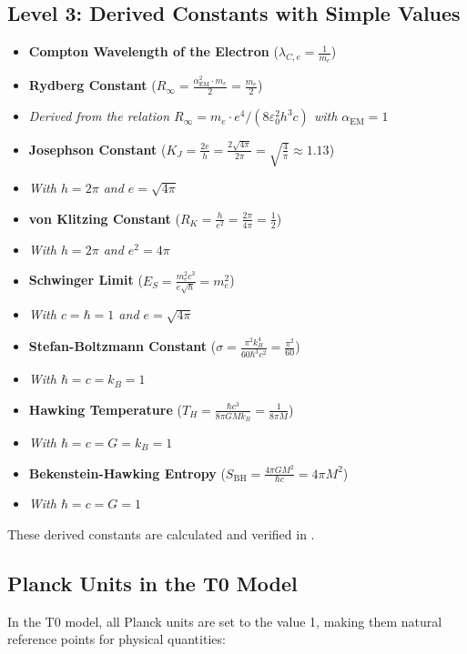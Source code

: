 \documentclass[12pt,a4paper]{article}
\newcommand{\alphaEM}{\alpha_{\text{EM}}}
\begin{document}
	\subsection*{Level 3: Derived Constants with Simple Values}
	\begin{itemize}[itemsep=0.5em]
		\item \textbf{Compton Wavelength of the Electron} (\(\lambda_{C,e} = \frac{1}{m_e}\))
		\item \textbf{Rydberg Constant} (\(R_\infty = \frac{\alphaEM^2 \cdot m_e}{2} = \frac{m_e}{2}\))
		\item[] \textit{Derived from the relation $R_\infty = m_e\cdot e^4/(8\varepsilon_0^2h^3c)$ with $\alphaEM = 1$}
		\item \textbf{Josephson Constant} (\(K_J = \frac{2e}{h} = \frac{2\sqrt{4\pi}}{2\pi} = \sqrt{\frac{4}{\pi}} \approx 1.13\))
		\item[] \textit{With $h = 2\pi$ and $e = \sqrt{4\pi}$}
		\item \textbf{von Klitzing Constant} (\(R_K = \frac{h}{e^2} = \frac{2\pi}{4\pi} = \frac{1}{2}\))
		\item[] \textit{With $h = 2\pi$ and $e^2 = 4\pi$}
		\item \textbf{Schwinger Limit} (\(E_S = \frac{m_e^2c^3}{e\sqrt{\hbar}} = m_e^2\))
		\item[] \textit{With $c = \hbar = 1$ and $e = \sqrt{4\pi}$}
		\item \textbf{Stefan-Boltzmann Constant} (\(\sigma = \frac{\pi^2k_B^4}{60\hbar^3c^2} = \frac{\pi^2}{60}\))
		\item[] \textit{With $\hbar = c = k_B = 1$}
		\item \textbf{Hawking Temperature} (\(T_H = \frac{\hbar c^3}{8\pi GMk_B} = \frac{1}{8\pi M}\))
		\item[] \textit{With $\hbar = c = G = k_B = 1$}
		\item \textbf{Bekenstein-Hawking Entropy} (\(S_{\mathrm{BH}} = \frac{4\pi GM^2}{\hbar c} = 4\pi M^2\))
		\item[] \textit{With $\hbar = c = G = 1$}
	\end{itemize}
	
	These derived constants are calculated and verified in \cite{pascher_nateinhsystem_2025}.
	
	\subsection*{Planck Units in the T0 Model}
	
	In the T0 model, all Planck units are set to the value 1, making them natural reference points for physical quantities:
	
\end{document}
